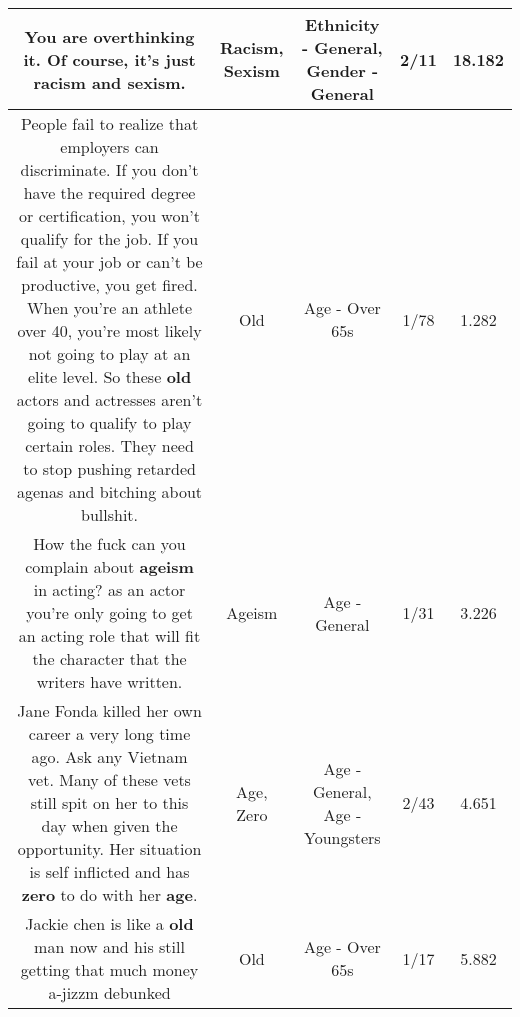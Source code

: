 \documentclass[11pt]{article}
\newlength\mylength
\begin{document}
\begin{center}
\begin{longtable}{|C{.65\mylength}|C{.30\mylength}|C{.12\mylength}|C{.12\mylength}|C{.12\mylength}|}
  \small You are overthinking it. Of course, it's just \textbf{racism} and \textbf{sexism}.\normalsize   & Racism, Sexism & Ethnicity - General, Gender - General & 2/11 & 18.182 \\  \hline
  \small People fail to realize that employers can discriminate. If you don't have the required degree or certification, you won't qualify for the job. If you fail at your job or can't be productive, you get fired. When you're an athlete over 40, you're most likely not going to play at an elite level. So these \textbf{old} actors and actresses aren't going to qualify to play certain roles. They need to stop pushing retarded agenas and bitching about bullshit.\normalsize   & Old & Age - Over 65s & 1/78 & 1.282 \\  \hline
  \small How the fuck can you complain about \textbf{ageism} in acting? as an actor you're only going to get an acting role that will fit the character that the writers have written.\normalsize   & Ageism & Age - General & 1/31 & 3.226 \\  \hline
  \small Jane Fonda killed her own career a very long time ago. Ask any Vietnam vet. Many of these vets still spit on her to this day when given the opportunity. Her situation is self inflicted and has \textbf{zero} to do with her \textbf{age}.\normalsize   & Age, Zero & Age - General, Age - Youngsters & 2/43 & 4.651 \\  \hline
  \small Jackie chen is like a \textbf{old} man now and his still getting that much money a-jizzm debunked\normalsize   & Old & Age - Over 65s & 1/17 & 5.882 \\  \hline

\end{longtable}
\end{center}
\end{document}
